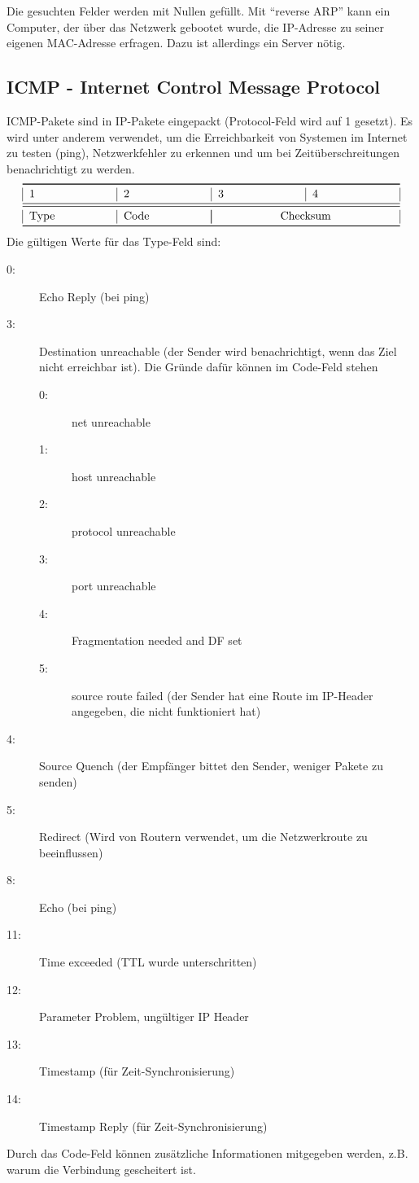 \documentclass[a4paper,10pt]{scrartcl}
\begin{document}
        Die gesuchten Felder werden mit Nullen gefüllt. Mit “reverse ARP” kann ein Computer, der über das Netzwerk gebootet wurde, die IP-Adresse zu seiner eigenen MAC-Adresse erfragen. Dazu ist allerdings ein Server nötig.
    \subsection{ICMP - Internet Control Message Protocol}
        ICMP-Pakete sind in IP-Pakete eingepackt (Protocol-Feld wird auf 1 gesetzt). Es wird unter anderem verwendet, um  die Erreichbarkeit von Systemen im Internet zu testen (ping), Netzwerkfehler zu erkennen und um bei Zeitüberschreitungen benachrichtigt zu werden.\\
        
        \[
        \begin{tabular}{|p{2.5cm}|p{2.5cm}|p{2.5cm}|p{2.5cm}|}    
            \toprule 
            1 & 2 & 3 & 4  \\
            \midrule\midrule
            Type & Code & \multicolumn{2}{|c|}{Checksum}\\
            \bottomrule
        \end{tabular}
        \]
        Die gültigen Werte für das Type-Feld sind:
        \begin{description}
            \item[0:] Echo Reply (bei ping)
            \item[3:] Destination unreachable (der Sender wird benachrichtigt, wenn das Ziel nicht erreichbar ist). Die Gründe dafür können im Code-Feld stehen
            \begin{description}
            \item[0:] net unreachable
            \item[1:] host unreachable
            \item[2:] protocol unreachable
            \item[3:] port unreachable
            \item[4:] Fragmentation needed and DF set
            \item[5:] source route failed (der Sender hat eine Route im IP-Header angegeben, die nicht funktioniert hat)
            \end{description}
            \item[4:] Source Quench (der Empfänger bittet den Sender, weniger Pakete zu senden)
            \item[5:] Redirect (Wird von Routern verwendet, um die Netzwerkroute zu beeinflussen)
            \item[8:] Echo (bei ping)
            \item[11:] Time exceeded (TTL wurde unterschritten)
            \item[12:] Parameter Problem, ungültiger IP Header
            \item[13:] Timestamp (für Zeit-Synchronisierung)
            \item[14:] Timestamp Reply (für Zeit-Synchronisierung)
        \end{description}
        Durch das Code-Feld können zusätzliche Informationen mitgegeben werden, z.B. warum die Verbindung gescheitert ist.
\end{document}
